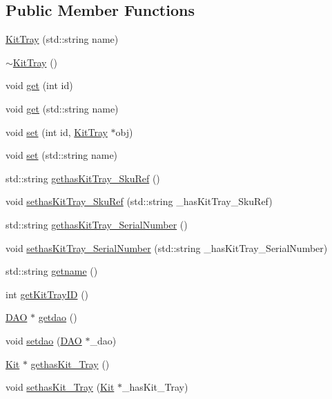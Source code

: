 \subsection*{Public Member Functions}
\begin{DoxyCompactItemize}
\item 
\hyperlink{class_kit_tray_a32b249a2133b961b2e6376c8e38b8db7}{KitTray} (std::string name)
\item 
\hyperlink{class_kit_tray_ac6078fde34d13c6bd83c18d862598c40}{$\sim$KitTray} ()
\item 
void \hyperlink{class_kit_tray_ad153e437ec9e8e1afa9bc5ca139c5798}{get} (int id)
\item 
void \hyperlink{class_kit_tray_af0877c7a86b0991789a065024aa2d064}{get} (std::string name)
\item 
void \hyperlink{class_kit_tray_a0107dcb14c3fc01cc9bf9bdd407e1301}{set} (int id, \hyperlink{class_kit_tray}{KitTray} $\ast$obj)
\item 
void \hyperlink{class_kit_tray_a4b55709e9f04a99305e6a81875ee638d}{set} (std::string name)
\item 
std::string \hyperlink{class_kit_tray_ab572a9b09ae7ddc054b901e7cc484b7b}{gethasKitTray\_\-SkuRef} ()
\item 
void \hyperlink{class_kit_tray_a36e7698c74681d39cf5685ed103ec93c}{sethasKitTray\_\-SkuRef} (std::string \_\-hasKitTray\_\-SkuRef)
\item 
std::string \hyperlink{class_kit_tray_a3ee67215b305a5fbadfa645c8b1e6307}{gethasKitTray\_\-SerialNumber} ()
\item 
void \hyperlink{class_kit_tray_a3a6e1e000cc628d07735408b4a87ff1e}{sethasKitTray\_\-SerialNumber} (std::string \_\-hasKitTray\_\-SerialNumber)
\item 
std::string \hyperlink{class_kit_tray_a16417b0bcebb23afce3405349fe28dfd}{getname} ()
\item 
int \hyperlink{class_kit_tray_af498143c918a0d614aa956d56af154f0}{getKitTrayID} ()
\item 
\hyperlink{class_d_a_o}{DAO} $\ast$ \hyperlink{class_kit_tray_a7506daade964c5eee8a5218a7bb06bc8}{getdao} ()
\item 
void \hyperlink{class_kit_tray_a85651a1d085dc1702e1a29f332267c9c}{setdao} (\hyperlink{class_d_a_o}{DAO} $\ast$\_\-dao)
\item 
\hyperlink{class_kit}{Kit} $\ast$ \hyperlink{class_kit_tray_a041a39ea131577e249e474ed30a43a59}{gethasKit\_\-Tray} ()
\item 
void \hyperlink{class_kit_tray_a443460e99a07f8db6816bf7b46709b43}{sethasKit\_\-Tray} (\hyperlink{class_kit}{Kit} $\ast$\_\-hasKit\_\-Tray)

\end{DoxyCompactItemize}
